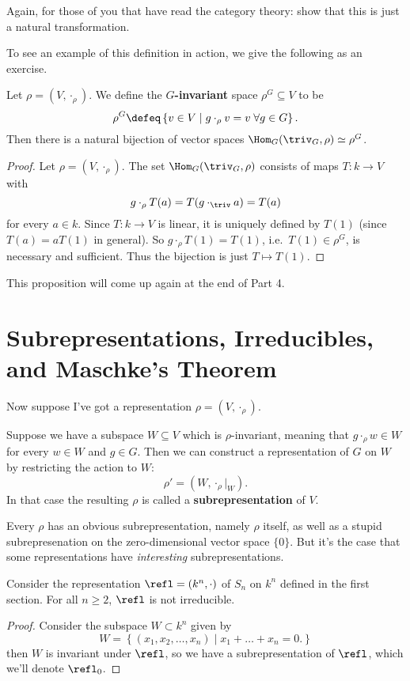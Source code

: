 \begin{ques}
	Again, for those of you that have read the category theory:
	show that this is just a natural transformation.
\end{ques}

To see an example of this definition in action, we give the following as an exercise.
\begin{proposition}
	Let $\rho = \left( V, \cdot_\rho \right)$.
	We define the \textbf{$G$-invariant} space $\rho^G \subseteq V$ to be
	\[ \rho^G \defeq \left\{ v \in V \mid g \cdot_\rho v = v \; \forall g \in G  \right\}. \]
	Then there is a natural bijection of vector spaces $\Hom_G(\triv_G, \rho) \simeq \rho^G$.
\end{proposition}
\begin{proof}
	Let $\rho = (V, \cdot_\rho)$.
	The set $\Hom_G(\triv_G, \rho)$ consists of maps $T : k \to V$ with
	\[ g \cdot_\rho T(a) = T(g \cdot_{\triv} a) = T(a) \]
	for every $a \in k$.
	Since $T : k \to V$ is linear, it is uniquely defined by $T(1)$
	(since $T(a) = a T(1)$ in general).
	So $g \cdot_\rho T(1) = T(1)$, i.e.\ $T(1) \in \rho^G$,
	is necessary and sufficient.
	Thus the bijection is just $T \mapsto T(1)$.
\end{proof}
This proposition will come up again at the end of Part 4.

\section{Subrepresentations, Irreducibles, and Maschke's Theorem}
Now suppose I've got a representation $\rho = (V, \cdot_\rho)$.
\begin{definition}
	Suppose we have a subspace $W \subseteq V$ which is $\rho$-invariant, meaning that $g \cdot_\rho w \in W$ for every $w \in W$ and $g \in G$.
	Then we can construct a representation of $G$ on $W$ by restricting the action to $W$:
	\[ \rho' = \left( W, \cdot_\rho|_W \right). \]
	In that case the resulting $\rho$ is called a \textbf{subrepresentation} of $V$.
\end{definition}
Every $\rho$ has an obvious subrepresentation, namely $\rho$ itself,
as well as a stupid subrepresenation on the zero-dimensional vector space $\{0\}$.
But it's the case that some representations have \emph{interesting} subrepresentations.
\begin{example}
	Consider the representation $\refl = (k^n, \cdot)$ of $S_n$ on $k^n$ defined in the first section.
	For all $n \ge 2$, $\refl$ is not irreducible.
\end{example}
\begin{proof}
	Consider the subspace $W \subset k^n$ given by
	\[ W = \left\{ (x_1, x_2, \dots, x_n) \mid x_1 + \dots + x_n = 0. \right\} \]
	then $W$ is invariant under $\refl$, so we have a subrepresentation
	of $\refl$, which we'll denote $\refl_0$.
\end{proof}

